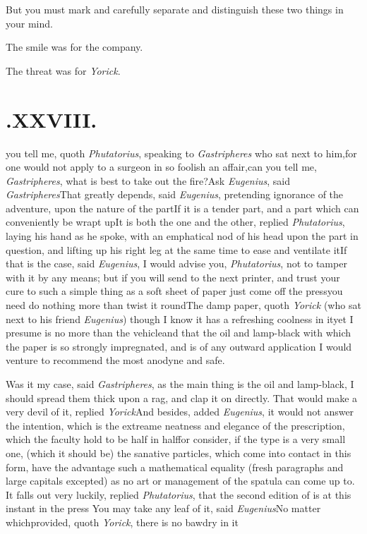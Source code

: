 \documentclass[twoside]{article}
\begin{document}
But you must mark and carefully separate and distinguish these
two things in your mind.

\tsk The smile was for the company.

\tsk The threat was for \textit{Yorick}.

\bigskip
\section{.\enspace XXVIII.}

 you tell me, quoth
\textit{Phuta\-torius}, speaking to \textit{Gastripheres} who sat next to him,\tsk for
one would not apply to a surgeon in so foolish an affair,\tsk can you tell me,
\textit{Gastripheres}, what is best to take out the fire?\tsk Ask \textit{Eugenius},
said \textit{Gastripheres}\tsk That greatly depends, said \textit{Eugenius},
pretending ignorance of the adventure, upon the nature of the part\tsk If it is a
tender part, and a part which can conveniently be wrapt up\tsk It is both the one
and the other, replied \textit{Phutatorius}, laying his hand as he spoke, with an
emphatical nod of his head upon the part in question, and lifting up his right leg
at the same time to ease and ventilate it\tsh If that is the case, said
\textit{Eugenius}, I would advise you, \textit{Phutatorius}, not to tamper with it
by any means; but if you will send to the next printer, and trust your cure to such
a simple thing as a soft sheet of paper just come off the press\tsk you need do
nothing more than twist it round\tsk The damp paper, quoth \textit{Yorick} (who sat
next to his friend \textit{Eugenius}) though I know it has a refreshing coolness in
it\tsk yet I presume is no more than the vehicle\tsk and that the oil and lamp-black
with which the paper is so strongly impregnated,\break
{}
and is of any outward application I would venture to recommend
the most anodyne and safe.

Was it my case, said \textit{Gastripheres}, as the main thing is the oil and
lamp-black, I should spread them thick upon a rag, and clap it on directly. That
would make a very devil of it, replied \textit{Yorick}\tsh And besides, added
\textit{Eugenius}, it would not answer the intention, which is the extreame neatness
and elegance of the prescription, which the faculty hold to be half in half\tsk for
consider, if the type is a very small one, (which it should be) the sanative
particles, which come into contact in this form, have the advantage 
such a mathematical equality (fresh pa\-ragraphs and
large capitals excepted) as no art or management of the spatula can come up to.
It falls out very luckily, replied \textit{Phutatorius}, that the second edition of
 is at this instant in the press\tsk
You may take any leaf of it, said \textit{Eugenius}\tsk No matter which\tsk provided,
quoth \textit{Yorick}, there is no bawdry in it\tsh
\end{document}
